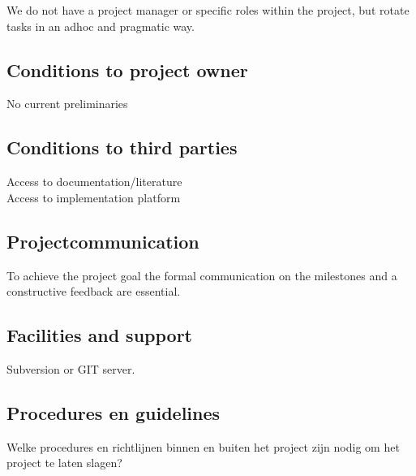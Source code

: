 \documentclass{article}
\begin{document}
We do not have a project manager or specific roles within the project, but rotate tasks in an adhoc and pragmatic way.

\subsection{Conditions to project owner}

No current preliminaries

\subsection{Conditions to third parties}

Access to documentation/literature\\
Access to implementation platform

\subsection{Projectcommunication}

To achieve the project goal the formal communication on the milestones and a constructive feedback are essential.

\subsection{Facilities and support}

Subversion or GIT server.

\subsection{Procedures en guidelines}
Welke procedures en richtlijnen binnen en buiten het project zijn nodig om het project te laten slagen?
\end{document}
